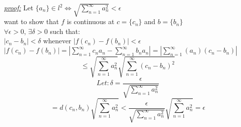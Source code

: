 \documentclass{amsbook}
\begin{document}



\begin{tcolorbox}[enhanced,attach boxed title to top center={yshift=-3mm,yshifttext=-1mm},
  colback=blue!5!white,colframe=blue!75!black,colbacktitle=red!80!black,
  title=Exercise 40.11:,fonttitle=\bfseries,
  boxed title style={size=small,colframe=red!50!black} ]
     \textit{\color{blue}\underline{proof:}}
Let $\{a_n\} \in l^2\iff \sqrt{\sum_{n=1}^{\infty} a_n ^2}<\epsilon$\\
want to show that $f$ is continuous at $c=\{c_n\}$ and $b=\{b_n\}$\\
$\forall\epsilon>0$, $\exists\delta>0$ such that:\\
$|c_n-b_n|<\delta$ whenever $|f(c_n)-f(b_n)|<\epsilon$\\
$|f(c_n)-f(b_n)|=|\sum_{n=1}^{\infty}c_n a_n-\sum_{n=1}^{\infty}b_n 
a_n|=|\sum_{n=1}^{\infty}(a_n)(c_n-b_n)|$\\
$$\leq\sqrt{\sum_{n=1}^{\infty}
a_n^2}\sqrt{\sum_{n=1}^{\infty}(c_n-b_n)^2}$$
{\color{red}$$Let:\delta=\frac{\epsilon}{\sqrt{\sum_{n=1}^{\infty}a_n^2}}$$}
$$=d(c_n,b_n)\sqrt{\sum_{n=1}^{\infty} 
a_n^2}<\frac{\epsilon}{\sqrt{\sum_{n=1}^{\infty} 
a_n^2}}\sqrt{\sum_{n=1}^{\infty} a_n^2}=\epsilon$$
\end{tcolorbox}

\end{document}
